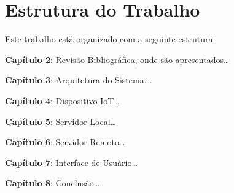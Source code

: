 \section{Estrutura do Trabalho}
Este trabalho está organizado com a seguinte estrutura:

\textbf{Capítulo 2}: Revisão Bibliográfica, onde são apresentados\dots

\textbf{Capítulo 3}: Arquitetura do Sistema\dots.

\textbf{Capítulo 4}: Dispositivo IoT\dots

\textbf{Capítulo 5}: Servidor Local\dots

\textbf{Capítulo 6}: Servidor Remoto\dots

\textbf{Capítulo 7}: Interface de Usuário\dots

\textbf{Capítulo 8}: Conclusão\dots
